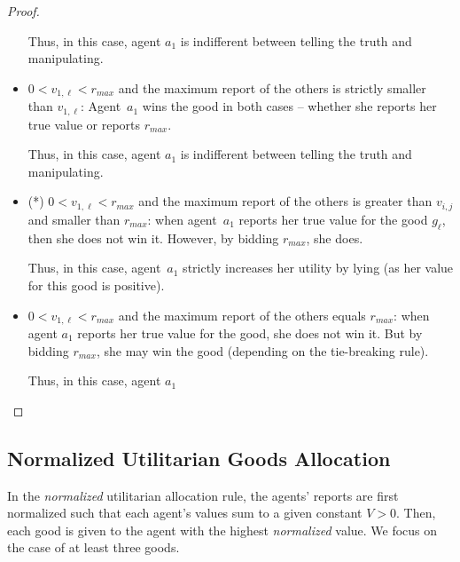 \begin{proof}
\begin{itemize}
        Thus, in this case, agent $a_1$ is indifferent between telling the truth and manipulating.
        
    
        \item $0 < v_{1,\ell} < r_{max}$ and the maximum report of the others is strictly smaller than $v_{1,\ell}$: Agent~$a_1$ wins the good in both cases -- whether she reports her true value or reports $r_{max}$.
        
        Thus, in this case, agent $a_1$ is indifferent between telling the truth and manipulating.

        
        \item (*) $0 < v_{1,\ell} < r_{max}$ and the maximum report of the others is greater than $v_{i,j}$ and smaller than $r_{max}$: when agent~$a_1$ reports her true value for the good $g_{\ell}$, then she does not win it. However, by bidding $r_{max}$, she does. 

        Thus, in this case, agent~$a_1$ strictly increases her utility by lying (as her value for this good is positive).

        

        \item $0 < v_{1,\ell} < r_{max}$ and the maximum report of the others equals $r_{max}$: 
        when agent $a_1$ reports her true value for the good, she does not win it. 
        But by bidding $r_{max}$, she may win the good (depending on the tie-breaking rule).

        Thus, in this case, agent $a_1$ 
    \end{itemize}
\end{proof}



\subsection{Normalized Utilitarian Goods Allocation}\label{sec:normalized-utilitarian-alloc}

In the \emph{normalized} utilitarian allocation rule, the agents' reports are first normalized such that each agent's values sum to a given constant $V >0$.
Then, each good is given to the agent with the highest \emph{normalized} value.
%
We focus on the case of at least three goods.

